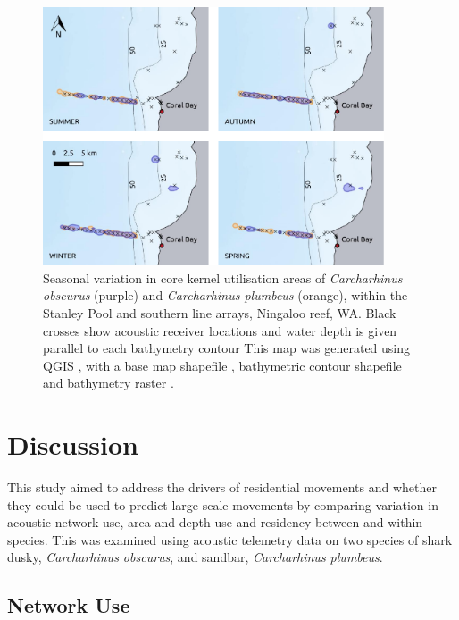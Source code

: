 \documentclass[11pt,a4paper]{article}
\begin{document}
	\begin{figure}[h!]
		\centering\includegraphics[width=0.9\textwidth]{../Results/Coral_bay.pdf}
		\caption{Seasonal variation in core kernel utilisation areas of \textit{Carcharhinus obscurus} (purple) and \textit{Carcharhinus plumbeus} (orange), within the Stanley Pool and southern line arrays, Ningaloo reef, WA. Black crosses show acoustic receiver locations and water depth is given parallel to each bathymetry contour This map was generated using QGIS \citep{QGISDevelopmentTeam2019}, with a base map shapefile \citep{AustralianBureauofStatistics2011}, bathymetric contour shapefile \citep{GEBCOCompilationGroup2019} and bathymetry raster \citep{Whiteway2009}.}
		\label{depth_south}
	\end{figure}		
		
	\newpage
	\section{Discussion}
	
	This study aimed to address the drivers of residential movements and whether they could be used to predict large scale movements by comparing variation in acoustic network use, area and depth use and residency between and within species. This was examined using acoustic telemetry data on two species of shark dusky, \textit{Carcharhinus obscurus}, and sandbar, \textit{Carcharhinus plumbeus}.

	\subsection{Network Use}
	
\end{document}
